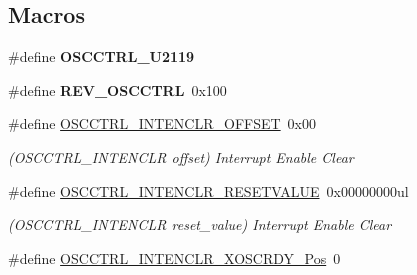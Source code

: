 \subsection*{Macros}
\begin{DoxyCompactItemize}
\item 
\hypertarget{group___s_a_m_l21___o_s_c_c_t_r_l_gaad77deebe396e8d724482ce3371daa3b}{}\#define {\bfseries O\+S\+C\+C\+T\+R\+L\+\_\+\+U2119}\label{group___s_a_m_l21___o_s_c_c_t_r_l_gaad77deebe396e8d724482ce3371daa3b}

\item 
\hypertarget{group___s_a_m_l21___o_s_c_c_t_r_l_ga6b54b5893648d56d4a469eea979adea1}{}\#define {\bfseries R\+E\+V\+\_\+\+O\+S\+C\+C\+T\+R\+L}~0x100\label{group___s_a_m_l21___o_s_c_c_t_r_l_ga6b54b5893648d56d4a469eea979adea1}

\item 
\hypertarget{group___s_a_m_l21___o_s_c_c_t_r_l_ga3f1d364493d38c935e8c304effcf6801}{}\#define \hyperlink{group___s_a_m_l21___o_s_c_c_t_r_l_ga3f1d364493d38c935e8c304effcf6801}{O\+S\+C\+C\+T\+R\+L\+\_\+\+I\+N\+T\+E\+N\+C\+L\+R\+\_\+\+O\+F\+F\+S\+E\+T}~0x00\label{group___s_a_m_l21___o_s_c_c_t_r_l_ga3f1d364493d38c935e8c304effcf6801}

\begin{DoxyCompactList}\small\item\em (O\+S\+C\+C\+T\+R\+L\+\_\+\+I\+N\+T\+E\+N\+C\+L\+R offset) Interrupt Enable Clear \end{DoxyCompactList}\item 
\hypertarget{group___s_a_m_l21___o_s_c_c_t_r_l_gad54389e0eae425ccea549728bfe6bd79}{}\#define \hyperlink{group___s_a_m_l21___o_s_c_c_t_r_l_gad54389e0eae425ccea549728bfe6bd79}{O\+S\+C\+C\+T\+R\+L\+\_\+\+I\+N\+T\+E\+N\+C\+L\+R\+\_\+\+R\+E\+S\+E\+T\+V\+A\+L\+U\+E}~0x00000000ul\label{group___s_a_m_l21___o_s_c_c_t_r_l_gad54389e0eae425ccea549728bfe6bd79}

\begin{DoxyCompactList}\small\item\em (O\+S\+C\+C\+T\+R\+L\+\_\+\+I\+N\+T\+E\+N\+C\+L\+R reset\+\_\+value) Interrupt Enable Clear \end{DoxyCompactList}\item 
\hypertarget{group___s_a_m_l21___o_s_c_c_t_r_l_gad840e74b4b8a5bce231c57763f3d6a27}{}\#define \hyperlink{group___s_a_m_l21___o_s_c_c_t_r_l_gad840e74b4b8a5bce231c57763f3d6a27}{O\+S\+C\+C\+T\+R\+L\+\_\+\+I\+N\+T\+E\+N\+C\+L\+R\+\_\+\+X\+O\+S\+C\+R\+D\+Y\+\_\+\+Pos}~0\label{group___s_a_m_l21___o_s_c_c_t_r_l_gad840e74b4b8a5bce231c57763f3d6a27}


\end{DoxyCompactItemize}
